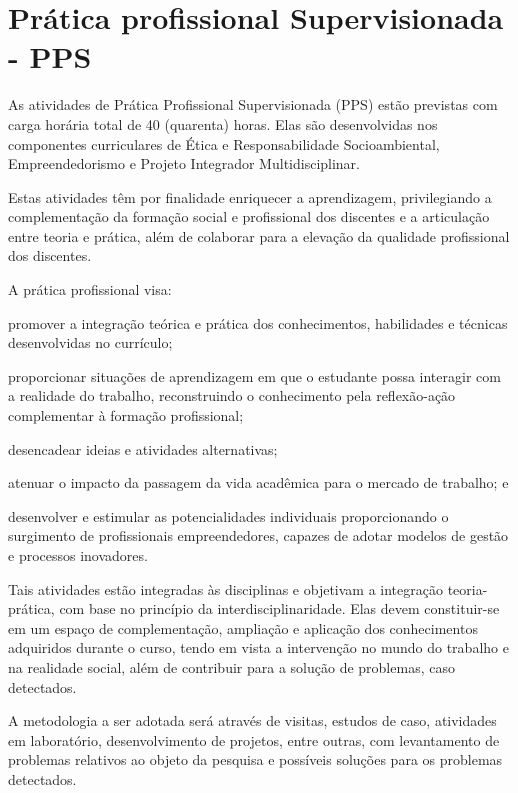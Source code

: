 \documentclass[
	12pt,				%
	openright,			%
	twoside,			%
	a4paper,			%
	chapter=TITLE,		%
	english,			%
	french,				%
	spanish,			%
	brazil,				%
	]{abntex2}
\begin{document}
\chapter{Prática profissional Supervisionada - PPS}
As atividades de Prática Profissional Supervisionada (PPS) estão previstas
com carga horária total de 40 (quarenta) horas. Elas são desenvolvidas nos
componentes curriculares de Ética e Responsabilidade Socioambiental, Empreendedorismo e Projeto Integrador Multidisciplinar.

Estas atividades têm por finalidade enriquecer a aprendizagem, privilegiando a
complementação da formação social e profissional dos discentes e a articulação
entre teoria e prática, além de colaborar para a elevação da qualidade
profissional dos discentes.

A prática profissional visa:
\begin{alineas}
	\item promover a integração teórica e prática dos conhecimentos, habilidades e
técnicas desenvolvidas no currículo;
	\item proporcionar situações de aprendizagem em que o estudante possa
interagir com a realidade do trabalho, reconstruindo o conhecimento pela
reflexão-ação complementar à formação profissional;
	\item desencadear ideias e atividades alternativas;
	\item atenuar o impacto da passagem da vida acadêmica para o mercado de
trabalho; e
	\item desenvolver e estimular as potencialidades individuais proporcionando o
surgimento de profissionais empreendedores, capazes de adotar modelos
de gestão e processos inovadores. 
	 	
\end{alineas}

Tais atividades estão integradas às disciplinas e objetivam a integração teoria-
prática, com base no princípio da interdisciplinaridade. Elas devem constituir-se em
um espaço de complementação, ampliação e aplicação dos conhecimentos adquiridos
durante o curso, tendo em vista a intervenção no mundo do trabalho e na realidade
social, além de contribuir para a solução de problemas, caso detectados.


A metodologia a ser adotada será através de visitas, estudos de caso,
atividades em laboratório, desenvolvimento de projetos, entre outras, com
levantamento de problemas relativos ao objeto da pesquisa e possíveis soluções para
os problemas detectados.
\end{document}

